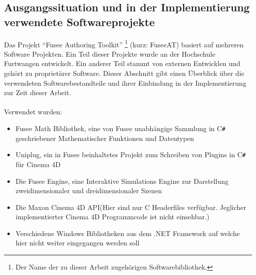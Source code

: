 \documentclass[pagesize, paper=a4, fontsize=12pt, titlepage=true, headings=small, headnosepline, abstractoff, liststotoc, nochapterprefix, plainheadsepline, twoside]{scrreprt}
\newcommand{\CSS}{C\texttt{\# }}
\newcommand{\CPPS}{C\nolinebreak\hspace{-.05em}\raisebox{.4ex}{\tiny\bf +}\nolinebreak\hspace{-.10em}\raisebox{.4ex}{\tiny\bf +} }
\begin{document}
\subsection{Ausgangssituation und in der Implementierung verwendete Softwareprojekte}
Das Projekt “Fusee Authoring Toolkit” \footnote{Der Name der zu dieser Arbeit zugehörigen Softwarebibliothek.} (kurz: FuseeAT) basiert auf mehreren Software Projekten. Ein Teil dieser Projekte wurde an der Hochschule Furtwangen entwickelt. Ein anderer Teil stammt von externen Entwicklen und gehört zu proprietärer Software. Dieser Abschnitt gibt einen Überblick über die verwendeten Softwarebestandteile und ihrer Einbindung in der Implementierung zur Zeit dieser Arbeit.
\\
\\
Verwendet wurden:
\begin{itemize}
\item Fusee Math Bibliothek, eine von Fusee unabhängige Sammlung in \CSS geschriebener Mathematischer Funktionen und Datentypen
\item Uniplug, ein in Fusee beinhaltetes Projekt zum Schreiben von Plugins in \CSS für Cinema 4D
\item Die Fusee Engine, eine Interaktive Simulations Engine zur Darstellung zweidimensionaler und dreidimensionaler Szenen
\item Die Maxon Cinema 4D API(Hier sind nur \CPPS Headerfiles verfügbar. Jeglicher implementierter Cinema 4D Programmcode ist nicht einsehbar.)
\item Verschiedene Windows Bibliotheken aus dem .NET Framework auf welche hier nicht weiter eingegangen werden soll
\end{itemize}
\end{document}
